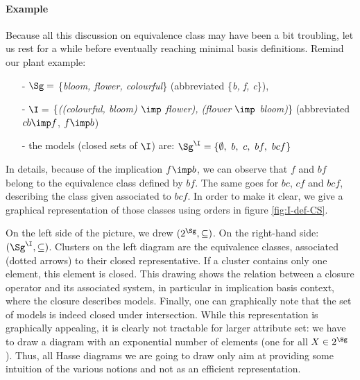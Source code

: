 \paragraph{Example} Because all this discussion on equivalence class may have
been a bit troubling, let us rest for a while before eventually reaching 
minimal basis definitions. Remind our plant example:
\begin{itemize}
	\item[-] $\Sg = $ \{\textit{bloom, flower, colourful}\} (abbreviated 
	\{\textit{b, f, c}\}),
	\item[-] $\I = $ \{\textit{((colourful, bloom) $\imp$ flower), (flower 
	$\imp$ bloom)}\} (abbreviated $cb \imp f$, $f \imp b$)
	\item[-] the models (closed sets of $\I$) are: $\Sg^{\I} = \{ \emptyset, \ 
	b, \ c, \ bf, \ bcf \}$
\end{itemize}
\noindent In details, because of the implication $f \imp b$, we can observe 
that $f$ and $bf$ belong to the equivalence class defined by $bf$. The same
goes for $bc$, $cf$ and $bcf$, describing the class given associated to $bcf$.
In order to make it clear, we give a graphical representation of those classes
using orders in figure \ref{fig:I-def-CS}.

\begin{figure}[ht]
	
\end{figure}

\vspace{1.2em}

On the left side of the picture, we drew $(2^{\Sg}, \subseteq)$. On the
right-hand side: $(\Sg^{\I}, \subseteq)$. Clusters on the left diagram are
the equivalence classes, associated (dotted arrows) to their
closed representative. If a cluster contains only one element, this element is 
closed. This drawing shows the relation between a closure operator and its 
associated system, in particular in implication basis context, where the 
closure describes models. Finally, one can graphically note that the set of 
models is indeed closed under intersection. While this representation is 
graphically appealing, it is clearly not tractable for larger attribute set: we 
have to draw a diagram with an exponential number of elements (one for all $X 
\in 2^{\Sg}$). Thus, all Hasse diagrams we are going to draw only aim at 
providing some intuition of the various notions and not as an efficient 
representation.

\vspace{1.2em}

